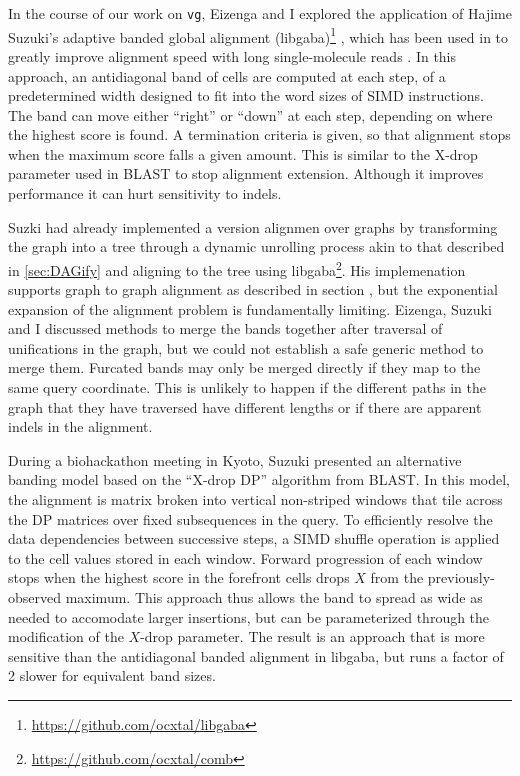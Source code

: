 In the course of our work on {\tt vg}, Eizenga and I explored the application of Hajime Suzuki's adaptive banded global alignment (libgaba)\footnote{\url{https://github.com/ocxtal/libgaba}} \cite{suzuki2017acceleration}, which has been used in to greatly improve alignment speed with long single-molecule reads \cite{li2018minimap2}.
In this approach, an antidiagonal band of cells are computed at each step, of a predetermined width designed to fit into the word sizes of SIMD instructions.
The band can move either ``right'' or ``down'' at each step, depending on where the highest score is found.
A termination criteria is given, so that alignment stops when the maximum score falls a given amount.
This is similar to the X-drop parameter used in BLAST to stop alignment extension.
Although it improves performance it can hurt sensitivity to indels.

Suzki had already implemented a version alignmen over graphs by transforming the graph into a tree through a dynamic unrolling process akin to that described in \ref{sec:DAGify} and aligning to the tree using libgaba\footnote{\url{https://github.com/ocxtal/comb}}.
His implemenation supports graph to graph alignment as described in section \label{sec:translation}, but the exponential expansion of the alignment problem is fundamentally limiting.
Eizenga, Suzuki and I discussed methods to merge the bands together after traversal of unifications in the graph, but we could not establish a safe generic method to merge them.
Furcated bands may only be merged directly if they map to the same query coordinate.
This is unlikely to happen if the different paths in the graph that they have traversed have different lengths or if there are apparent indels in the alignment.

During a biohackathon meeting in Kyoto, Suzuki presented an alternative banding model based on the ``X-drop DP'' algorithm from BLAST.
In this model, the alignment is matrix broken into vertical non-striped windows that tile across the DP matrices over fixed subsequences in the query.
To efficiently resolve the data dependencies between successive steps, a SIMD shuffle operation is applied to the cell values stored in each window.
Forward progression of each window stops when the highest score in the forefront cells drops $X$ from the previously-observed maximum.
This approach thus allows the band to spread as wide as needed to accomodate larger insertions, but can be parameterized through the modification of the $X$-drop parameter.
The result is an approach that is more sensitive than the antidiagonal banded alignment in libgaba, but runs a factor of 2 slower for equivalent band sizes.

